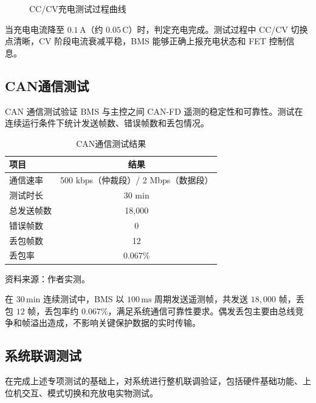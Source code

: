 \begin{figure}[htbp]
  \centering
  \caption{CC/CV充电测试过程曲线}
  \label{fig:cc_cv_charge_curve}
\end{figure}

当充电电流降至 $0.1\,\mathrm{A}$（约 $0.05\,\mathrm{C}$）时，判定充电完成。测试过程中 CC/CV 切换点清晰，CV 阶段电流衰减平稳，BMS 能够正确上报充电状态和 FET 控制信息。

\subsection{CAN通信测试}

CAN 通信测试验证 BMS 与主控之间 CAN-FD 遥测的稳定性和可靠性。测试在连续运行条件下统计发送帧数、错误帧数和丢包情况。

\begin{table}[htbp]
  \centering
  \caption{CAN通信测试结果}
  \label{tab:can_test}
  \begin{tabular}{@{}lc@{}}
    \toprule
    \textbf{项目} & \textbf{结果} \\
    \midrule
    通信速率         & 500 kbps（仲裁段）/ 2 Mbps（数据段） \\
    测试时长         & 30 min \\
    总发送帧数       & 18,000 \\
    错误帧数         & 0 \\
    丢包帧数         & 12 \\
    丢包率           & $0.067\%$ \\
    \bottomrule
  \end{tabular}
\end{table}
\vspace{-0.3em}
{\small 资料来源：作者实测。}

在 $30\,\mathrm{min}$ 连续测试中，BMS 以 $100\,\mathrm{ms}$ 周期发送遥测帧，共发送 $18,000$ 帧，丢包 $12$ 帧，丢包率约 $0.067\%$，满足系统通信可靠性要求。偶发丢包主要由总线竞争和帧溢出造成，不影响关键保护数据的实时传输。

\subsection{系统联调测试}

在完成上述专项测试的基础上，对系统进行整机联调验证，包括硬件基础功能、上位机交互、模式切换和充放电实物测试。

